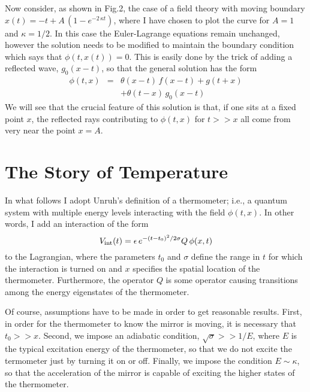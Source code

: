 \documentclass[12pt]{article}
\begin{document}
Now consider, as shown in Fig.2, the case of a field theory with moving
boundary $x(t) = -t + A\,(1-e^{-2\,\kappa t})$, where I have chosen to plot
the curve for $A=1$ and $\kappa=1/2$.  In this case the Euler-Lagrange equations
remain unchanged, however the solution needs to be modified to maintain the
boundary condition which says that $\phi(t,x(t)) = 0$.
This is easily done by the trick of adding a reflected
wave, $g_0(x-t)$, so that the general solution has the form
\begin{eqnarray}
\phi(t,x) &=& \theta(x-t)\,f(x-t) + g(t+x) \nonumber \\
& &+ \theta(t-x)\,g_0(x-t)
\end{eqnarray}
We will see that the crucial feature of this solution is that, if one sits at a fixed
point $x$, the reflected rays contributing to $\phi(t,x)$ for $t >> x$
all come from very near the point $x = A$.

\epsfverbosetrue
\begin{figure}
\begin{center}
\leavevmode
\vskip 1in
\end{center}
\vskip -1.5in
\caption[movingmirror]{}
\label{movingmirror}
\end{figure}

\section{The Story of Temperature}

In what follows I adopt Unruh's definition of a thermometer; i.e., a
quantum system with multiple energy levels interacting with
the field $\phi(t,x)$.  In other words,
I add an interaction of the form 
\begin{equation}
V_{\rm int}(t) = \epsilon\,e^{-(t-t_0)^2/2\sigma} Q\,\phi(x,t)    
\end{equation}
to the Lagrangian,
where the parameters $t_0$ and $\sigma$ define the range in $t$ for which
the interaction is turned on and $x$ specifies the spatial location of the thermometer.
Furthermore, the operator $Q$ is some operator causing transitions among the
energy eigenstates of the thermometer.

Of course, assumptions have to be made in order to get reasonable results.
First, in order for the thermometer to know the mirror is moving, it is
necessary that $t_0 >> x$.  Second, we impose an adiabatic condition,
$\sqrt{\sigma} >> 1/E$, where $E$
is the typical excitation energy of the thermometer, so that we do not excite
the termometer just by turning it on or off.  Finally, we impose the condition
$ E \sim \kappa $, so that the
acceleration of the mirror is capable of exciting the higher states of the thermometer.
\end{document}
